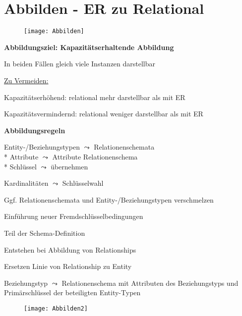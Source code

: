 \section{Abbilden - ER zu Relational}
\label{sec:abbilden}

\begin{figure}[H]\centering\label{Abbilden}\texttt{[image: Abbilden]}\end{figure}

\textbf{Abbildungsziel: Kapazitätserhaltende Abbildung}
\begin{items}
	\item In beiden Fällen gleich viele Instanzen darstellbar
	\item \underline{Zu Vermeiden:}
	\item Kapazitätserhöhend: relational mehr darstellbar als mit ER
	\item Kapazitätsvermindernd: relational weniger darstellbar als mit ER
\end{items}

\textbf{Abbildungsregeln}
\begin{items}
	\item Entity-/Beziehungstypen \( \leadsto \) Relationenschemata \\* Attribute \( \leadsto \) Attribute Relationenschema \\* Schlüssel \( \leadsto \) übernehmen
	\item Kardinalitäten \( \leadsto \) Schlüsselwahl
	\item Ggf. Relationenschemata und Entity-/Beziehungstypen verschmelzen
	\item Einführung neuer Fremdschlüsselbedingungen
	\begin{enumeration}
		\item Teil der Schema-Definition
		\item Entstehen bei Abbildung von Relationships
		\item Ersetzen Linie von Relationship zu Entity
	\end{enumeration}
	\item Beziehungstyp \( \leadsto \) Relationenschema mit Attributen des Beziehungstyps und Primärschlüssel der beteiligten Entity-Typen
\end{items}
\begin{figure}[H]\centering\label{Abbilden2}\texttt{[image: Abbilden2]}\end{figure}

